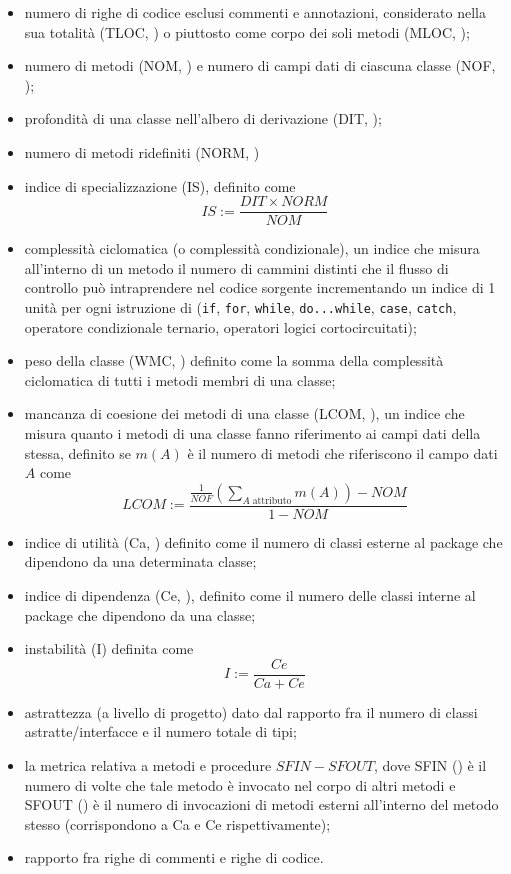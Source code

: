 \begin{itemize}
  \item numero di righe di codice esclusi commenti e annotazioni, considerato nella sua totalità (TLOC, ) o piuttosto come corpo dei soli metodi (MLOC, );
  \item numero di metodi (NOM, ) e numero di campi dati di ciascuna classe (NOF, );
  \item profondità di una classe nell'albero di derivazione (DIT, );
  \item numero di metodi ridefiniti (NORM, )
  \item indice di specializzazione (IS), definito come \[
  IS := \frac{DIT \times NORM}{NOM}
  \]
  \item complessità ciclomatica (o complessità condizionale), un indice che misura all'interno di un metodo il numero di cammini distinti che il flusso di controllo può intraprendere nel codice sorgente incrementando un indice di 1 unità per ogni istruzione di  (\verb+if+, \verb+for+, \verb+while+, \verb+do...while+, \verb+case+, \verb+catch+, operatore condizionale ternario, operatori logici cortocircuitati);
  \item peso della classe (WMC, ) definito come la somma della complessità ciclomatica di tutti i metodi membri di una classe;
  \item mancanza di coesione dei metodi di una classe (LCOM, ), un indice che misura quanto i metodi di una classe fanno riferimento ai campi dati della stessa, definito se $m(A)$ è il numero di metodi che riferiscono il campo dati $A$ come \[
  LCOM := \frac{\frac{1}{NOF}\left(\displaystyle\sum_{A\;\mathrm{attributo}}{m(A)}\right) - NOM}{1-NOM}
  \]
  \item indice di utilità (Ca, ) definito come il numero di classi esterne al package che dipendono da una determinata classe;
  \item indice di dipendenza (Ce, ), definito come il numero delle classi interne al package che dipendono da una classe;
  \item instabilità (I) definita come \[
  I := \frac{Ce}{Ca + Ce}
  \]
  \item astrattezza (a livello di progetto) dato dal rapporto fra il numero di classi astratte/interfacce e il numero totale di tipi;
  \item la metrica relativa a metodi e procedure $SFIN - SFOUT$, dove SFIN () è il numero di volte che tale metodo è invocato nel corpo di altri metodi e SFOUT () è il numero di invocazioni di metodi esterni all'interno del metodo stesso (corrispondono a Ca e Ce rispettivamente);
  \item rapporto fra righe di commenti e righe di codice.
\end{itemize}

